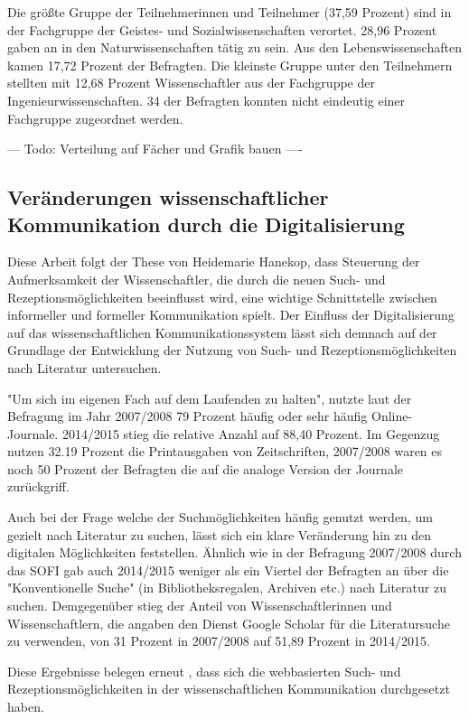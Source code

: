 Die größte Gruppe der Teilnehmerinnen und Teilnehmer (37,59 Prozent) sind in der Fachgruppe der Geistes- und Sozialwissenschaften verortet. 28,96 Prozent gaben an in den Naturwissenschaften tätig zu sein. Aus den Lebenswissenschaften kamen 17,72 Prozent der Befragten. Die kleinste Gruppe unter den Teilnehmern stellten mit 12,68 Prozent Wissenschaftler aus der Fachgruppe der Ingenieurwissenschaften. 34 der Befragten konnten nicht eindeutig einer Fachgruppe zugeordnet werden.

--- Todo: Verteilung auf Fächer und Grafik bauen ----


\subsection{Veränderungen wissenschaftlicher Kommunikation durch die Digitalisierung}

Diese Arbeit folgt der These von Heidemarie Hanekop, dass Steuerung der Aufmerksamkeit der Wissenschaftler, die durch die neuen Such- und Rezeptionsmöglichkeiten beeinflusst wird, eine wichtige Schnittstelle zwischen informeller und formeller Kommunikation spielt\cite{Hanekop_2014}. Der Einfluss der Digitalisierung auf das wissenschaftlichen Kommunikationssystem lässt sich demnach auf der Grundlage der Entwicklung der Nutzung von Such- und Rezeptionsmöglichkeiten nach Literatur untersuchen.

"Um sich im eigenen Fach auf dem Laufenden zu halten", nutzte laut der Befragung im Jahr 2007/2008 79 Prozent häufig oder sehr häufig Online-Journale. 2014/2015 stieg die relative Anzahl auf 88,40 Prozent. Im Gegenzug nutzen 32.19 Prozent die Printausgaben von Zeitschriften, 2007/2008 waren es noch 50 Prozent der Befragten die auf die analoge Version der Journale zurückgriff.

Auch bei der Frage welche der Suchmöglichkeiten häufig genutzt werden, um gezielt nach Literatur zu suchen, lässt sich ein klare Veränderung hin zu den digitalen Möglichkeiten feststellen. Ähnlich wie in der Befragung 2007/2008 durch das SOFI gab auch 2014/2015 weniger als ein Viertel der Befragten an über die "Konventionelle Suche" (in Bibliotheksregalen, Archiven etc.) nach Literatur zu suchen. Demgegenüber stieg der Anteil von Wissenschaftlerinnen und Wissenschaftlern, die angaben den Dienst Google Scholar für die Literatursuche zu verwenden, von 31 Prozent in 2007/2008 auf 51,89 Prozent in 2014/2015.

Diese Ergebnisse belegen erneut \cite{Hanekop_2014}, dass sich die webbasierten Such- und Rezeptionsmöglichkeiten in der wissenschaftlichen Kommunikation durchgesetzt haben.

